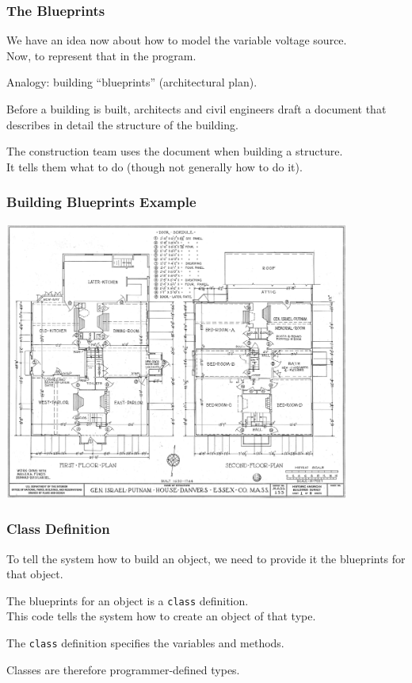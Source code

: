 \begin{frame}
\frametitle{The Blueprints}
We have an idea now about how to model the variable voltage source.\\
\quad Now, to represent that in the program.

Analogy: building ``blueprints'' (architectural plan).

Before a building is built, architects and civil engineers draft a document that describes in detail the structure of the building.

The construction team uses the document when building a structure.\\
\quad It tells them what to do (though not generally how to do it).

\end{frame}

\begin{frame}
\frametitle{Building Blueprints Example}

\begin{center}
	\includegraphics[width=0.85\textwidth]{images/putnamhouse.jpg}
\end{center}
\end{frame}

\begin{frame}
\frametitle{Class Definition}
To tell the system how to build an object, we need to provide it the blueprints for that object.

The blueprints for an object is a \alert{\texttt{class}} definition.\\
\quad This code tells the system how to create an object of that type.

The \texttt{class} definition specifies the variables and methods.

Classes are therefore programmer-defined types.

\end{frame}



